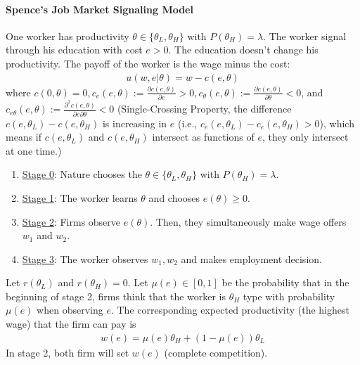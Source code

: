 \documentclass[11pt]{elegantbook_2}
\begin{document}
\paragraph*{Spence's Job Market Signaling Model} One worker has productivity $\theta\in\{\theta_L,\theta_H\}$ with $P(\theta_H)=\lambda$. The worker signal through his education with cost $e>0$. The education doesn't change his productivity. The payoff of the worker is the wage minus the cost:
\begin{equation}
    \begin{aligned}
        u(w,e|\theta)=w-c(e,\theta)
    \end{aligned}
    \nonumber
\end{equation}
where $c(0,\theta)=0,c_e(e,\theta):=\frac{\partial c(e,\theta)}{\partial e}>0, c_\theta(e,\theta):=\frac{\partial c(e,\theta)}{\partial \theta}<0$, and $c_{e\theta}(e,\theta):=\frac{\partial^2 c(e,\theta)}{\partial e\partial \theta}<0$ (Single-Crossing Property, the difference $c(e,\theta_L)-c(e,\theta_H)$ is increasing in $e$ (i.e., $c_e(e,\theta_L)-c_e(e,\theta_H)>0$), which means if $c(e,\theta_L)$ and $c(e,\theta_H)$ intersect as functions of $e$, they only intersect at one time.)
\begin{enumerate}[]
    \item \underline{Stage 0}: Nature chooses the $\theta\in\{\theta_L,\theta_H\}$ with $P(\theta_H)=\lambda$.
    \item \underline{Stage 1}: The worker learns $\theta$ and chooses $e(\theta)\geq 0$.
    \item \underline{Stage 2}: Firms observe $e(\theta)$. Then, they simultaneously make wage offers $w_1$ and $w_2$.
    \item \underline{Stage 3}: The worker observes $w_1,w_2$ and makes employment decision.
\end{enumerate}
Let $r(\theta_L)$ and $r(\theta_H)=0$. Let $\mu(e)\in[0,1]$ be the probability that in the beginning of stage 2, firms think that the worker is $\theta_H$ type with probability $\mu(e)$ when observing $e$. The corresponding expected productivity (the highest wage) that the firm can pay is
\begin{equation}
    \begin{aligned}
        w(e)=\mu(e)\theta_H+(1-\mu(e))\theta_L
    \end{aligned}
    \nonumber
\end{equation}
In stage 2, both firm will set $w(e)$ (complete competition).
\end{document}

